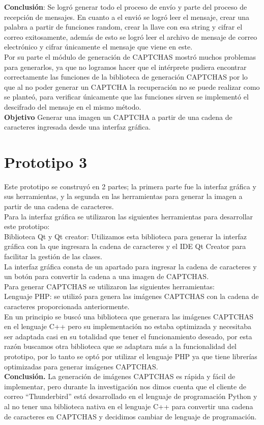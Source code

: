 \documentclass[12pt,oneside,onecolumn,openany]{report}
\begin{document}
\textbf{Conclusión}:
Se logró generar todo el proceso de envío y parte del proceso de recepción de mensajes. En cuanto a el envió se logró leer el mensaje, crear una palabra a partir de funciones random, crear la llave con esa string y cifrar el correo exitosamente, además de esto se logró leer el archivo de mensaje de correo electrónico y cifrar únicamente el mensaje que viene en este.\\
Por su parte el módulo de generación de CAPTCHAS mostró muchos problemas para generarlos, ya que no logramos hacer que el intérprete pudiera encontrar correctamente las funciones de la biblioteca de generación CAPTCHAS por lo que al no poder generar un CAPTCHA la recuperación no se puede realizar como se planteó, para verificar únicamente que las funciones sirven se implementó el descifrado del mensaje en el mismo método.\\


\textbf{Objetivo}
Generar una imagen un CAPTCHA a partir de una cadena de caracteres ingresada desde una interfaz gráfica.
\section{Prototipo 3}
Este prototipo se construyó en 2 partes; la primera parte fue la interfaz gráfica y sus herramientas, y la segunda en las herramientas para generar la imagen a partir de una cadena de caracteres.\\
Para la interfaz gráfica se utilizaron las siguientes herramientas para desarrollar este prototipo:\\
Biblioteca Qt y Qt creator: Utilizamos esta biblioteca para generar la interfaz gráfica con la que ingresara la cadena de caracteres y el IDE Qt Creator para facilitar la gestión de las clases.\\
La interfaz gráfica consta de un apartado para ingresar la cadena de caracteres y un botón para convertir la cadena a una imagen de CAPTCHAS.\\
Para generar CAPTCHAS se utilizaron las siguientes herramientas:\\
Lenguaje PHP: se utilizó para genera las imágenes CAPTCHAS con la cadena de caracteres proporcionada anteriormente.\\
En un principio se buscó una biblioteca que generara las imágenes CAPTCHAS en el lenguaje C++ pero su implementación no estaba optimizada y necesitaba ser adaptada casi en su totalidad que tener el funcionamiento deseado, por esta razón buscamos otra biblioteca que se adaptara más a la funcionalidad del prototipo, por lo tanto se optó por utilizar el lenguaje PHP ya que tiene librerías optimizadas para generar imágenes CAPTCHAS.\\
\textbf{Conclusión.}
La generación de imágenes CAPTCHAS es rápida y fácil de implementar, pero durante la investigación nos dimos cuenta que el cliente de correo “Thunderbird” está desarrollado en el lenguaje de programación Python y al no tener una biblioteca nativa en el lenguaje C++ para convertir una cadena de caracteres en CAPTCHAS y  decidimos cambiar de lenguaje de programación.\\
\end{document}

